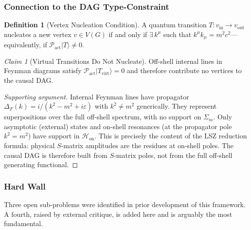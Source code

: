 \documentclass[11pt,a4paper]{article}
\theoremstyle{plain}
\theoremstyle{definition}
\newtheorem{definition}[theorem]{Definition}
\theoremstyle{remark}
\newtheorem{claim}[theorem]{Claim}
\newcommand{\Pact}{\mathcal{P}_{\mathrm{act}}}
\newcommand{\Hon}{\mathcal{H}_{\mathrm{on}}}
\newcommand{\Sigmam}{\Sigma_{m}}
\newcommand{\ket}[1]{|#1\rangle}
\begin{document}
\subsubsection{Connection to the DAG Type-Constraint}

\begin{definition}[Vertex Nucleation Condition]
A quantum transition $T: v_{\mathrm{in}} \to v_{\mathrm{out}}$ nucleates a new
vertex $v \in V(G)$ if and only if $\exists\,k^{\mu}$ such that $k^{\mu}k_{\mu} =
m^{2}c^{2}$---equivalently, if $\Pact\ket{T} \neq 0$.
\end{definition}

\begin{claim}[Virtual Transitions Do Not Nucleate]
Off-shell internal lines in Feynman diagrams satisfy $\Pact\ket{T_{\mathrm{virt}}}
= 0$ and therefore contribute no vertices to the causal DAG.
\end{claim}

\begin{proof}[Supporting argument]
Internal Feynman lines have propagator $\Delta_{F}(k) = i/(k^{2} - m^{2} +
i\varepsilon)$ with $k^{2} \neq m^{2}$ generically. They represent superpositions
over the full off-shell spectrum, with no support on $\Sigmam$. Only asymptotic
(external) states and on-shell resonances (at the propagator pole $k^{2} = m^{2}$)
have support in $\Hon$. This is precisely the content of the LSZ reduction formula:
physical $S$-matrix amplitudes are the residues at on-shell poles. The causal DAG
is therefore built from $S$-matrix poles, not from the full off-shell generating
functional.
\end{proof}

\subsubsection{Hard Wall}
\label{sec:hardwall}

Three open sub-problems were identified in prior development of this framework.
A fourth, raised by external critique, is added here and is arguably the most
fundamental.
\end{document}
